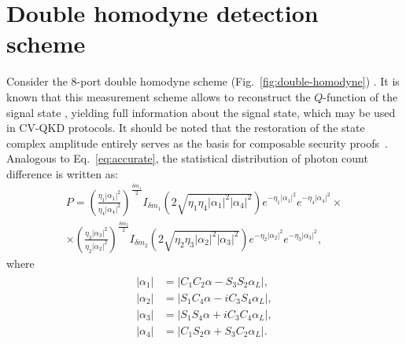 \section{Double homodyne detection scheme}\label{sec-double-homodyne}

Consider the 8-port double homodyne scheme (Fig.~\ref{fig:double-homodyne}) \cite{lahti2010realistic}. It is known that this measurement scheme allows to reconstruct the $Q$-function of the signal state \cite{Richter:98}, yielding full information about the signal state, which may be used in CV-QKD protocols. It should be noted that the restoration of the state complex amplitude entirely serves as the basis for composable security proofs~\cite{PhysRevLett.93.170504,PhysRevLett.118.200501,pirandola2024improvedcomposablekeyrates,pascualgarcía2024improvedfinitesizekeyrates}. Analogous to Eq.~\eqref{eq:accurate}, the statistical distribution of photon count difference is written as:
\begin{multline}
P= \left(\frac{\eta_1|\alpha_1|^2}{\eta_4|\alpha_4|^2}\right)^{\frac{\delta m_1}{2}}
I_{\delta m_1}\left(2\sqrt{\eta_1\eta_4|\alpha_ 1|^2|\alpha_4|^2}\right)
e^{-\eta_1|\alpha_1|^2}
e^{-\eta_4|\alpha_4|^2}\times\\\times
\left(\frac{\eta_3|\alpha_3|^2}{\eta_2|\alpha_2|^2}\right)^{\frac{\delta m_2}{2}}
I_{\delta m_2}\left(2\sqrt{\eta_2\eta_3|\alpha_ 2|^2|\alpha_3|^2}\right)
e^{-\eta_2|\alpha_2|^2}
e^{-\eta_3|\alpha_3|^2}\label{eq:accurate-dh},
\end{multline}
where
\begin{align}
\begin{split}
    |\alpha_1|&=|
    C_1C_2\alpha
    -S_3S_2\alpha_L|,\\
    |\alpha_2|&=
    |S_1C_4\alpha
    -iC_3S_4\alpha_L|,\\
    |\alpha_3|&=|
     S_1S_4\alpha
    +iC_3C_4\alpha_L|,\\
    |\alpha_4|&=|
    C_1S_2\alpha+
    S_3C_2\alpha_L|.
\end{split}
\end{align}

